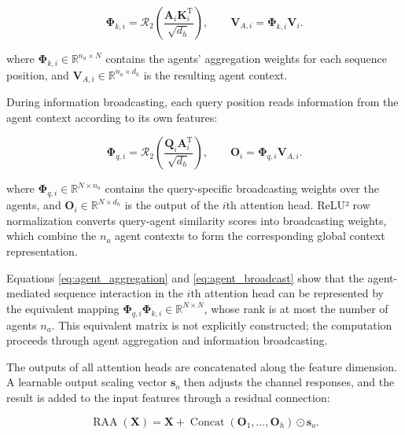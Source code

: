 \begin{equation}
\boldsymbol{\Phi}_{k,i}
=
\mathcal R_2
\left(
\frac{\mathbf A_i\mathbf K_i^{\mathrm T}}{\sqrt{d_h}}
\right),
\qquad
\mathbf V_{A,i}
=
\boldsymbol{\Phi}_{k,i}\mathbf V_i.
\label{eq:agent_aggregation}
\end{equation}

where $\boldsymbol{\Phi}_{k,i}\in\mathbb R^{n_a\times N}$ contains the agents' aggregation weights for each sequence position, and $\mathbf V_{A,i}\in\mathbb R^{n_a\times d_h}$ is the resulting agent context.

During information broadcasting, each query position reads information from the agent context according to its own features:

\begin{equation}
\boldsymbol{\Phi}_{q,i}
=
\mathcal R_2
\left(
\frac{\mathbf Q_i\mathbf A_i^{\mathrm T}}{\sqrt{d_h}}
\right),
\qquad
\mathbf O_i
=
\boldsymbol{\Phi}_{q,i}\mathbf V_{A,i}.
\label{eq:agent_broadcast}
\end{equation}

where $\boldsymbol{\Phi}_{q,i}\in\mathbb R^{N\times n_a}$ contains the query-specific broadcasting weights over the agents, and $\mathbf O_i\in\mathbb R^{N\times d_h}$ is the output of the $i$th attention head. ReLU² row normalization converts query-agent similarity scores into broadcasting weights, which combine the $n_a$ agent contexts to form the corresponding global context representation.

Equations \eqref{eq:agent_aggregation} and \eqref{eq:agent_broadcast} show that the agent-mediated sequence interaction in the $i$th attention head can be represented by the equivalent mapping $\boldsymbol{\Phi}_{q,i}\boldsymbol{\Phi}_{k,i}\in\mathbb R^{N\times N}$, whose rank is at most the number of agents $n_a$. This equivalent matrix is not explicitly constructed; the computation proceeds through agent aggregation and information broadcasting.

The outputs of all attention heads are concatenated along the feature dimension. A learnable output scaling vector $\mathbf s_o$ then adjusts the channel responses, and the result is added to the input features through a residual connection:

\begin{equation}
\operatorname{RAA}(\mathbf X)
=
\mathbf X+
\operatorname{Concat}(\mathbf O_1,\ldots,\mathbf O_h)\odot\mathbf s_o.
\label{eq:raa_output}
\end{equation}

